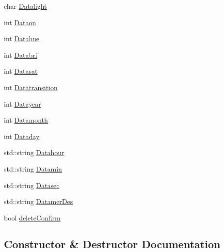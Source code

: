 \begin{DoxyCompactItemize}
char \hyperlink{classSingleSchedulerControlWidget_a655b725e6a6bc0146dbb4b6210c3e6d6}{Datalight}
\item 
int \hyperlink{classSingleSchedulerControlWidget_a2ba1dcbf2d85d36401dfa444f8419e76}{Dataon}
\item 
int \hyperlink{classSingleSchedulerControlWidget_af7d9c967a6a0fc8621e5fbdc5884e91b}{Datahue}
\item 
int \hyperlink{classSingleSchedulerControlWidget_a97f81e542ac0cf7d0e4e7382755e51ab}{Databri}
\item 
int \hyperlink{classSingleSchedulerControlWidget_ad21d4f657354f00e2c14b55cae4c876d}{Datasat}
\item 
int \hyperlink{classSingleSchedulerControlWidget_afc9b8081291095f9e6fdb1a9a048a2ba}{Datatransition}
\item 
int \hyperlink{classSingleSchedulerControlWidget_aef67a4f23fd8f100efb80e23c56c231b}{Datayear}
\item 
int \hyperlink{classSingleSchedulerControlWidget_acf568679a63621149ab2212944241684}{Datamonth}
\item 
int \hyperlink{classSingleSchedulerControlWidget_a8d3a1c66c75980878c35700a6544ae94}{Dataday}
\item 
std\+::string \hyperlink{classSingleSchedulerControlWidget_a7141fd690ac8ad3db9f4539763ad3db9}{Datahour}
\item 
std\+::string \hyperlink{classSingleSchedulerControlWidget_abb4a09ba0ce3ad37119bd0a13eb1979a}{Datamin}
\item 
std\+::string \hyperlink{classSingleSchedulerControlWidget_a5b662da906b80bb884245b96fc23dd68}{Datasec}
\item 
std\+::string \hyperlink{classSingleSchedulerControlWidget_a13ced62f55d57453da0a2f673e52d5d5}{Datamer\+Des}
\item 
bool \hyperlink{classSingleSchedulerControlWidget_a194a0b611fadec029f0e7c55154ed903}{delete\+Confirm}
\end{DoxyCompactItemize}


\subsection{Constructor \& Destructor Documentation}
